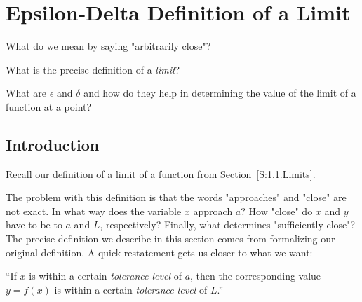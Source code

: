 \section{Epsilon-Delta Definition of a Limit} \label{S:1.4.precise}

\begin{goals}
\item What do we mean by saying "arbitrarily close"?
\item What is the precise definition of a \emph{limit}?
\item What are $\epsilon$ and $\delta$ and how do they help in determining the value of the limit of a function at a point?
\end{goals}

\subsection*{Introduction}

Recall our definition of a limit of a function from Section~\ref{S:1.1.Limits}.


The problem with this definition is that the words "approaches" and "close" are not exact.  In what way does the variable $x$ approach $a$? How "close" do $x$ and $y$ have to be to $a$ and $L$, respectively? Finally, what determines "sufficiently close"? The precise definition we describe in this section comes from formalizing our original definition.  A quick restatement gets us closer to what we want:

\begin{description}
\item ``If $x$ is within a certain \textit{tolerance level} of $a$, then the corresponding value $y=f(x)$ is within a certain \textit{tolerance level} of $L$.''
\end{description}


